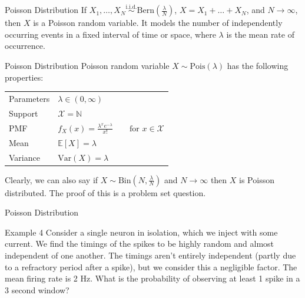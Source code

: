 \documentclass[10pt]{beamer}
\begin{document}
\begin{frame}[fragile]{Poisson Distribution}
If \(X_1, \dots, X_N \overset{\textrm{i.i.d.}}{\sim} \textrm{Bern}\left(\frac{\lambda}{N}\right)\), \(X = X_1 + \dots + X_N\), and \(N \rightarrow \infty\), then \(X\) is a Poisson random variable. It models the number of independently occurring events in a fixed interval of time or space, where \(\lambda\) is the mean rate of occurrence.

\begin{alertblock}{Poisson Distribution}
Poisson random variable \(X \sim \mathrm{Pois}\left(\lambda\right)\) has the following properties:
  \begin{table}
    \begin{tabular}{ll}
      \toprule
      Parameters & \(\lambda \in \left(0, \infty\right)\)\\
      Support & \(\mathcal{X} = \mathbb{N}\)\\
      PMF & \(f_X\left(x\right) = \frac{\lambda^x e^{-\lambda}}{x!}\qquad\textrm{for }x \in \mathcal{X}\)\\
      Mean & \(\mathbb{E}\left[X\right] = \lambda\)\\
      Variance & \(\textrm{Var}\left(X\right) = \lambda\)\\
      \bottomrule
    \end{tabular}
  \end{table}
\end{alertblock}

Clearly, we can also say if \(X \sim \textrm{Bin}\left(N, \frac{\lambda}{N}\right)\) and \(N \rightarrow \infty\) then \(X\) is Poisson distributed. The proof of this is a problem set question.
\end{frame}

\begin{frame}[fragile]{Poisson Distribution}
\begin{exampleblock}{Example 4}
Consider a single neuron in isolation, which we inject with some current. We find the timings of the spikes to be highly random and almost independent of one another. The timings aren't entirely independent (partly due to a refractory period after a spike), but we consider this a negligible factor. The mean firing rate is 2 Hz. What is the probability of observing at least 1 spike in a 3 second window?
\end{exampleblock}
\end{frame}
\end{document}
